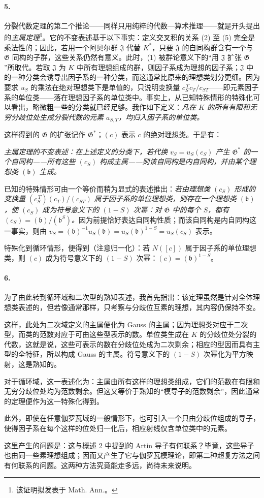 \documentclass[11pt]{article}
\providecommand{\Gg}{\mathfrak G}
\begin{document}
\paragraph{5.}
分裂代数定理的第二个推论——同样只用纯粹的代数—算术推理——就是开头提出的\emph{主属定理}\footnote{该证明拟发表于 Math. Ann.。}。它的不变表述基于以下事实：定义交叉积的关系 (2) 至 (5) 完全是乘法性的；因此，若用一个阿贝尔群 \(\mathfrak J\) 代替 \(K^\ast\)，只要 \(\mathfrak J\) 的自同构群含有一个与 \(\Gg\) 同构的子群，这些关系仍然有意义。此时，(1) 被群论意义下的“用 \(\mathfrak J\) 扩张 \(\Gg\)”所取代。若取 \(\mathfrak J\) 为 \(K\) 中所有理想组成的群，则因子系成为理想的因子系；\(\mathfrak J\) 中的一种分类会诱导出因子系的一种分类，而这通常比原来的理想类划分更细。因为要求 \(u_S\) 的乘法在绝对理想类下是单值的，只说明变换量 \(c_S^{\,T}c_T/c_{ST}\)——即元素因子系的单位类——落在理想因子系的单位类中。事实上，从已知特殊情形的特殊化可以看出，略微粗一些的分类就已经足够。我作如下定义：\emph{凡在 \(K\) 的所有有限和无穷分歧位处生成分裂代数的元素 \(a_{S,T}\)，均归入因子系的单位类。}

这样得到的 \(\Gg\) 的扩张记作 \(\Gg^\ast\)；\((c)\) 表示 \(c\) 的绝对理想类。于是有：

\emph{主属定理的不变表述：在上述定义的分类下，若代换 \(v_S=u_S(c_S)\) 产生 \(\Gg^\ast\) 的一个自同构——所有这些 \((c_S)\) 构成主属——则该自同构是内自同构，并由某个理想类 \((\mathfrak b)\) 生成。}

已知的特殊情形可由一个等价而稍为显式的表述推出：\emph{若由理想类 \((c_S)\) 形成的变换量 \((c_S^{\,T})(c_T)/(c_{ST})\) 属于因子系的单位理想类，则存在一个理想类 \((\mathfrak b)\)，使 \((c_S)\) 成为符号意义下的 \((1-S)\) 次幂：对 \(\Gg\) 中的每个 \(S\)，都有 \((c_S)=(\mathfrak b)/(\mathfrak b^{S})\)。}因为前提恰好表达自同构性质；而该自同构是内自同构这一事实，则由 \(v_S=(\mathfrak b)^{-1}u_S(\mathfrak b)=u_S(\mathfrak b)^{1-S}=u_S(c_S)\) 表示。

特殊化到循环情形，便得到（注意归一化）：若 \(N([c])\) 属于因子系的单位理想类，则 \((c)\) 成为符号意义下的 \((1-S)\) 次幂：\((c)=(\mathfrak b)^{1-S}\)。

\paragraph{6.}
为了由此转到循环域和二次型的熟知表述，我首先指出：该定理虽然是针对全体理想类表述的，但若像通常那样，只考察与分歧位互素的理想，其内容仍保持不变。

这样，此处为二次域定义的主属便化为 Gauss 的主属；因为理想类对应于二次型，而类的范数对应于可由这些型表示的数。单位类生成在 \(K\) 的分歧位处分裂的代数，这就是说，这些可表示的数在分歧位处成为二次剩余；相应的型因而具有主型的全特征，所以构成 Gauss 的主属。符号意义下的 \((1-S)\) 次幂化为平方映射，这是熟知的。

对于循环域，这一表述化为：主属由所有这样的理想类组成，它们的范数在有限和无穷分歧位处均为范数剩余。但这又等价于熟知的“模导子的范数剩余”，因此通常的定理便作为这一特殊化得到。

此外，即使在任意伽罗瓦域的一般情形下，也可引入一个只由分歧位组成的导子，使得因子系在每个这样的位处归一化后，相应射线仅含单位类中的元素。

这里产生的问题是：这与概述 2 中提到的 Artin 导子有何联系？毕竟，这些导子也由同一些素理想组成；因而又产生了它与伽罗瓦模理论，即第二种超复方法之间有何联系的问题。这两种方法究竟能走多远，尚待未来说明。
\end{document}
